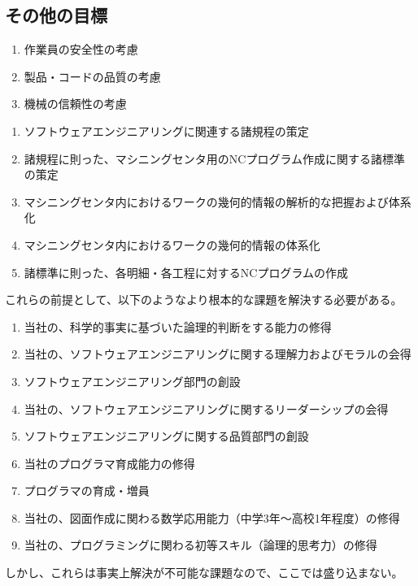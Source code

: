 \subsection{その他の目標}
\begin{enumerate}[label=\sarrow]
\item 作業員の安全性の考慮
\item 製品・コードの品質の考慮
\item 機械の信頼性の考慮
\end{enumerate}



\clearpage
\begin{enumerate}[label=\sarrow]
\item ソフトウェアエンジニアリングに関連する諸規程の策定
\item 諸規程に則った、マシニングセンタ用のNCプログラム作成に関する諸標準の策定
\item マシニングセンタ内におけるワークの幾何的情報の解析的な把握および体系化
\item マシニングセンタ内におけるワークの幾何的情報の体系化
\item 諸標準に則った、各明細・各工程に対するNCプログラムの作成
\end{enumerate}
\begin{hosoku}
これらの前提として、以下のようなより根本的な課題を解決する必要がある。
\begin{enumerate}[label=\sarrow]
\item[{\sarrow[red]}] 当社の、科学的事実に基づいた論理的判断をする能力の修得
\item[{\sarrow[red]}] 当社の、ソフトウェアエンジニアリングに関する理解力およびモラルの会得
\item[{\sarrow[red]}] ソフトウェアエンジニアリング部門の創設
\item[{\sarrow[red]}] 当社の、ソフトウェアエンジニアリングに関するリーダーシップの会得
\item[{\sarrow[red]}] ソフトウェアエンジニアリングに関する品質部門の創設
\item[{\sarrow[red]}] 当社のプログラマ育成能力の修得
\item[{\sarrow[red]}] プログラマの育成・増員
\item[{\sarrow[red]}] 当社の、図面作成に関わる数学応用能力（中学3年～高校1年程度）の修得
\item[{\sarrow[red]}] 当社の、プログラミングに関わる初等スキル（論理的思考力）の修得
\end{enumerate}
しかし、これらは事実上解決が不可能な課題なので、ここでは盛り込まない。
\end{hosoku}


